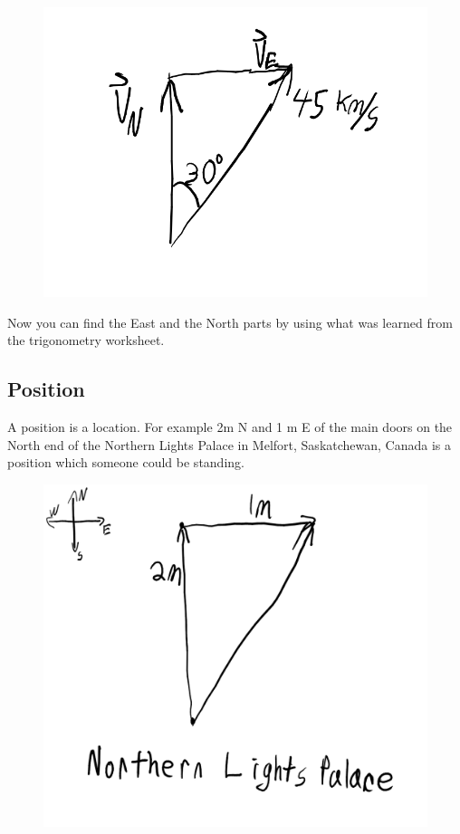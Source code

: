 \documentclass[12pt]{article}
\begin{document}
\begin{figure}[h]
\includegraphics[scale=0.25]{velocityTriangle.png}
\end{figure}

Now you can find the East and the North parts by using what was learned from the trigonometry worksheet.

\parbox[][12cm][t]{8cm}{}

\subsection{Position}
A position is a location. For example 2m N and 1 m E of the main doors on the North end of the Northern Lights Palace in Melfort, Saskatchewan, Canada is a position which someone could be standing.

\begin{figure}[h]
\includegraphics[scale=0.20]{NLPposition.png}
\end{figure}
\end{document}
